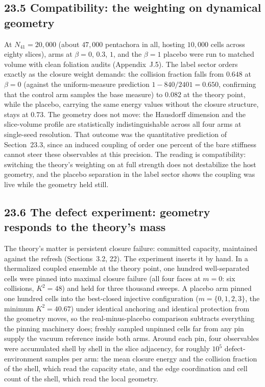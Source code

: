 \documentclass[11pt]{article}
\begin{document}
\subsection{23.5 Compatibility: the weighting on dynamical geometry}

At $N_{41}=20{,}000$ (about $47{,}000$ pentachora in all, hosting $10{,}000$ cells across eighty slices), arms at $\beta=0$, $0.3$, $1$, and the $\beta=1$ placebo were run to matched volume with clean foliation audits (Appendix~J.5). The label sector orders exactly as the closure weight demands: the collision fraction falls from $0.648$ at $\beta=0$ (against the uniform-measure prediction $1-840/2401=0.650$, confirming that the control arm samples the base measure) to $0.082$ at the theory point, while the placebo, carrying the same energy values without the closure structure, stays at $0.73$. The geometry does not move: the Hausdorff dimension and the slice-volume profile are statistically indistinguishable across all four arms at single-seed resolution. That outcome was the quantitative prediction of Section~23.3, since an induced coupling of order one percent of the bare stiffness cannot steer these observables at this precision. The reading is compatibility: switching the theory's weighting on at full strength does not destabilize the host geometry, and the placebo separation in the label sector shows the coupling was live while the geometry held still.

\subsection{23.6 The defect experiment: geometry responds to the theory's mass}

The theory's matter is persistent closure failure: committed capacity, maintained against the refresh (Sections~3.2, 22). The experiment inserts it by hand. In a thermalized coupled ensemble at the theory point, one hundred well-separated cells were pinned into maximal closure failure (all four faces at $m=0$: six collisions, $K^2=48$) and held for three thousand sweeps. A placebo arm pinned one hundred cells into the best-closed injective configuration ($m=\{0,1,2,3\}$, the minimum $K^2=40.67$) under identical anchoring and identical protection from the geometry moves, so the real-minus-placebo comparison subtracts everything the pinning machinery does; freshly sampled unpinned cells far from any pin supply the vacuum reference inside both arms. Around each pin, four observables were accumulated shell by shell in the slice adjacency, for roughly $10^5$ defect-environment samples per arm: the mean closure energy and the collision fraction of the shell, which read the capacity state, and the edge coordination and cell count of the shell, which read the local geometry.
\end{document}
